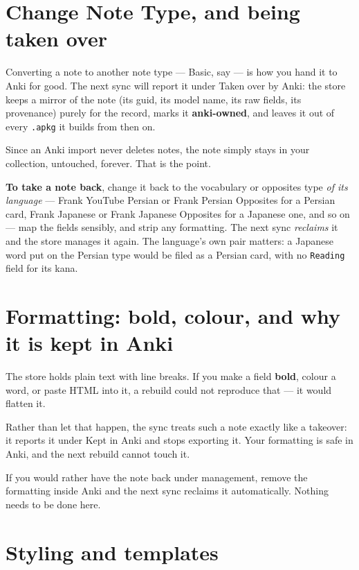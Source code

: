 \documentclass[11pt,oneside]{report}
\newcommand{\file}[1]{\texttt{#1}}
\newcommand{\menu}[1]{\textsf{#1}}
\begin{document}
\section{\menu{Change Note Type}, and being taken over}
\label{sec:takeover}

Converting a note to another note type --- \textsf{Basic}, say --- is how
you hand it to Anki for good. The next sync will report it under
\textsf{Taken over by Anki}: the store keeps a mirror of the note (its guid,
its model name, its raw fields, its provenance) purely for the record, marks
it \textbf{anki-owned}, and leaves it out of every \file{.apkg} it builds
from then on.

Since an Anki import never deletes notes, the note simply stays in your
collection, untouched, forever. That is the point.

\begin{goodbox}
\textbf{To take a note back}, change it back to the vocabulary or
opposites type \emph{of its language} --- \textsf{Frank YouTube Persian} or
\textsf{Frank Persian Opposites} for a Persian card, \textsf{Frank Japanese}
or \textsf{Frank Japanese Opposites} for a Japanese one, and so on --- map
the fields sensibly, and strip any formatting. The next sync \emph{reclaims}
it and the store manages it again. The language's own pair matters: a
Japanese word put on the Persian type would be filed as a Persian card, with
no \texttt{Reading} field for its kana.
\end{goodbox}

\section{Formatting: bold, colour, and why it is kept in Anki}
\label{sec:formatting}

The store holds plain text with line breaks. If you make a field
\textbf{bold}, colour a word, or paste HTML into it, a rebuild could not
reproduce that --- it would flatten it.

Rather than let that happen, the sync treats such a note exactly like a
takeover: it reports it under \textsf{Kept in Anki} and stops exporting it.
Your formatting is safe in Anki, and the next rebuild cannot touch it.

If you would rather have the note back under management, remove the
formatting inside Anki and the next sync reclaims it automatically. Nothing
needs to be done here.

\section{Styling and templates}
\label{sec:styling}
\end{document}
